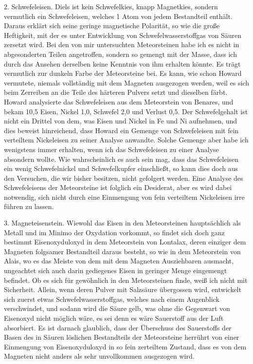 \documentclass[a4paper, 11pt, oneside]{article}
\begin{document}
2. Schwefeleisen. Diels ist kein Schwefelkies, knapp Magnetkies, sondern vermutlich ein Schwefeleisen, welches 1 Atom von jedem Bestandteil enthält. Daraus erklärt sich seine geringe magnetische Polarität, so wie die große Heftigkeit, mit der es unter Entwicklung von Schwefelwasserstoffgas von Säuren zersetzt wird. Bei den von mir untersuchten Meteorsteinen habe ich es nicht in abgesonderten Teilen angetroffen, sondern so gemengt mit der Masse, dass ich durch das Ansehen derselben keine Kenntnis von ihm erhalten könnte. Es trägt vermutlich zur dunkeln Farbe der Meteorsteine bei. Es kann, wie schon Howard vermutete, niemals vollständig mit dem Magneten ausgezogen werden, weil es sich beim Zerreiben an die Teile des härteren Pulvers setzt und dieselben färbt. Howard analysierte das Schwefeleisen aus dem Meteorstein von Benares, und bekam 10,5 Eisen, Nickel 1,0, Schwefel 2,0 und Verlust 0,5. Der Schwefelgehalt ist nicht ein Drittel von dem, was Eisen und Nickel in Fe und Ni aufnehmen, und dies beweist hinreichend, dass Howard ein Gemenge von Schwefeleisen mit fein verteiltem Nickeleisen zu seiner Analyse anwandte. Solche Gemenge aber habe ich wenigstens immer erhalten, wenn ich das Schwefeleisen zu einer Analyse absondern wollte. Wie wahrscheinlich es auch sein mag, dass das Schwefeleisen ein wenig Schwefelnickel und Schwefelkupfer einschließt, so kann dies doch aus den Versuchen, die wir bisher besitzen, nicht gefolgert werden. Eine Analyse des Schwefeleisens der Meteorsteine ist folglich ein Desiderat, aber es wird dabei notwendig, sich nicht durch eine Einmengung von fein verteiltem Nickeleisen irre führen zu lassen.

3. Magneteisenstein. Wiewohl das Eisen in den Meteorsteinen hauptsächlich als Metall und im Minimo der Oxydation vorkommt, so findet sich doch ganz bestimmt Eisenoxyduloxyd in dem Meteorstein von Lontalax, deren einziger dem Magneten folgsamer Bestandteil daraus besteht, so wie in dem Meteorstein von Alais, wo es das Meiste von dem mit dem Magneten Ausziehbaren ausmacht, ungeachtet sich auch darin gediegenes Eisen in geringer Menge eingemengt befindet. Ob es sich für gewöhnlich in den Meteorsteinen finde, weiß ich nicht mit Sicherheit. Allein, wenn deren Pulver mit Salzsäure übergossen wird, entwickelt sich zuerst etwas Schwefelwasserstoffgas, welches nach einem Augenblick verschwindet, und sodann wird die Säure gelb, was ohne die Gegenwart von Eisenoxyd nicht möglich wäre, es sei denn es wäre Sauerstoff aus der Luft absorbiert. Es ist darnach glaublich, dass der Überschuss des Sauerstoffs der Basen des in Säuren löslichen Bestandteils der Meteorsteine herrührt von einer Einmengung von Eisenoxyduloxyd in so fein zerteiltem Zustand, dass es von dem Magneten nicht anders als sehr unvollkommen ausgezogen wird.
\end{document}
